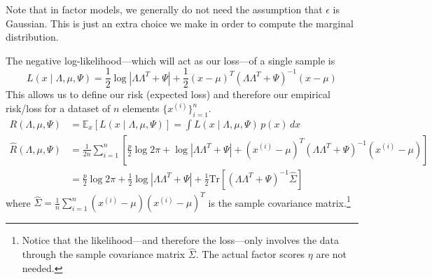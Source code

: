   Note that in factor models, we generally do not need the assumption that $\epsilon$ is Gaussian. This is just an extra choice we make in order to compute the marginal distribution. 

  \begin{theorem}
    \label{thm:log-likelihood-and-risk-of-linear-gaussian}
    The negative log-likelihood---which will act as our loss---of a single sample is 
    \begin{equation}
      L(x \mid \Lambda, \mu, \Psi) = \frac{1}{2} \log|\Lambda \Lambda^T + \Psi| + \frac{1}{2} (x - \mu)^T (\Lambda \Lambda^T + \Psi)^{-1} (x - \mu)
    \end{equation} 
    This allows us to define our risk (expected loss) and therefore our empirical risk/loss for a dataset of $n$ elements $\{x^{(i)}\}_{i=1}^n$. 
    \begin{align}
      R(\Lambda, \mu, \Psi) & = \mathbb{E}_x [ L(x \mid \Lambda, \mu, \Psi)] = \int L(x \mid \Lambda, \mu, \Psi) \, p(x) \,dx \\
      \hat{R}(\Lambda, \mu, \Psi) & = \frac{1}{2n} \sum_{i=1}^n \left[ \frac{p}{2} \log{2 \pi} + \log|\Lambda \Lambda^T + \Psi| + (x^{(i)} - \mu)^T (\Lambda \Lambda^T + \Psi)^{-1} (x^{(i)} - \mu) \right] \\ 
                                  & = \frac{p}{2} \log{2 \pi} + \frac{1}{2} \log|\Lambda \Lambda^T + \Psi| + \frac{1}{2} \text{Tr}\left[(\Lambda \Lambda^T + \Psi)^{-1} \hat{\Sigma}\right]
    \end{align}
    where $\hat{\Sigma} = \frac{1}{n}\sum_{i=1}^n (x^{(i)} - \mu)(x^{(i)} - \mu)^T$ is the sample covariance matrix.\footnote{Notice that the likelihood---and therefore the loss---only involves the data through the sample covariance matrix $\hat{\Sigma}$. The actual factor scores $\eta$ are not needed.}
  \end{theorem}
